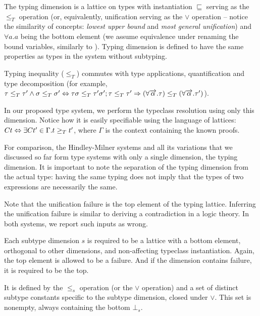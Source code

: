 \begin{defn}
    \label{def:typing}
    The typing dimension is a lattice on types with instantiation $\sqsubseteq$ serving as the $\leq_T$ operation (or, equivalently, unification serving as the $\lor$ operation -- notice the similarity of concepts: \emph{lowest upper bound} and \emph{most general unification}) and $\forall a . a$ being the bottom element (we assume equivalence under renaming the bound variables, similarly to \citet{barendregt1992lambda}). Typing dimension is defined to have the same properties as types in the system without subtyping.

    Typing inequality ($\leq_T$) commutes with type applications, quantification and type decomposition (for example, $\tau \leq_T \tau' \land \sigma \leq_T \sigma' \Leftrightarrow \tau \sigma \leq_T \tau' \sigma'; \tau \leq_T \tau' \Rightarrow (\forall \overrightarrow{\alpha} . \tau) \leq_T (\forall \overrightarrow{\alpha} . \tau')$).

\end{defn}

In our proposed type system, we perform the typeclass resolution using only this dimension. Notice how it is easily specifiable using the language of lattices: $C t \Leftrightarrow \exists C t' \in \Gamma . t \geq_T t'$, where $\Gamma$ is the context containing the known proofs.

For comparison, the Hindley-Milner systems and all its variations that we discussed so far form type systems with only a single dimension, the typing dimension. It is important to note the separation of the typing dimension from the actual type: having the same typing does not imply that the types of two expressions are necessarily the same.

Note that the unification failure is the top element of the typing lattice. Inferring the unification failure is similar to deriving a contradiction in a logic theory. In both systems, we report such inputs as wrong.

\begin{defn}
    \label{def:stDim}
    Each subtype dimension $s$ is required to be a lattice with a bottom element, orthogonal to other dimensions, and non-affecting typeclass instantiation. Again, the top element is allowed to be a failure. And if the dimension contains failure, it is required to be the top.

    It is defined by the $\leq_s$ operation (or the $\lor$ operation) and a set of distinct subtype constants specific to the subtype dimension, closed under $\lor$. This set is nonempty, always containing the bottom $\bot_s$.
\end{defn}

